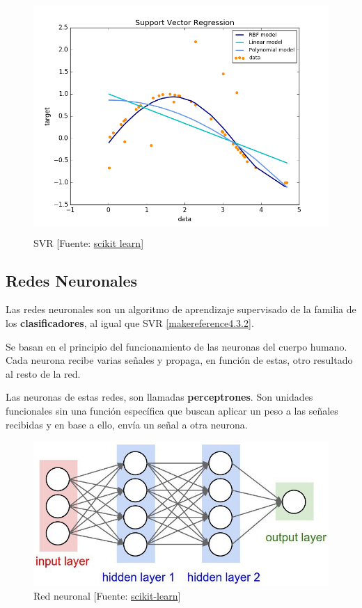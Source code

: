 	\begin{figure}[htb]
		\begin{center}
			\includegraphics[height=3.5in]{figures/svr.png}
			\caption{SVR [Fuente: \href{http://scikit-learn.org/stable/auto_examples/svm/plot_svm_regression.html}{scikit learn}] }
		\end{center}
		\label{svr}
	\end{figure}
	
	\subsection{Redes Neuronales}
	\label{makereference4.3.3}
	Las redes neuronales son un algoritmo de aprendizaje supervisado de la familia de los \textbf{clasificadores}, al igual que SVR \ref{makereference4.3.2}.

	Se basan en el principio del funcionamiento de las neuronas del cuerpo humano. Cada neurona recibe varias señales y propaga, en función de estas, otro resultado al resto de la red.

	Las neuronas de estas redes, son llamadas \textbf{perceptrones}. Son unidades funcionales sin una función específica que buscan aplicar un peso a las señales recibidas y en base a ello, envía un señal a otra neurona.

	\begin{figure}[htb]
		\begin{center}
			\includegraphics[width=4.5in]{figures/neural_network.jpg}
			\caption{Red neuronal [Fuente: \href{www.scikit-learn.org}{scikit-learn}]}
		\end{center}
		\label{network}
	\end{figure}

